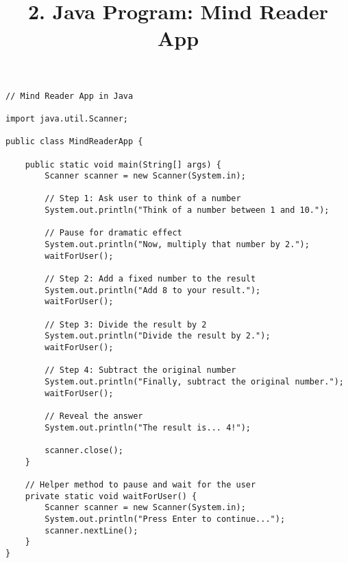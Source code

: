 \documentclass{article}
\begin{document}
\title{2. Java Program: Mind Reader App}
\author{}
\date{}
\maketitle

\begin{lstlisting}
// Mind Reader App in Java

import java.util.Scanner;

public class MindReaderApp {

    public static void main(String[] args) {
        Scanner scanner = new Scanner(System.in);
        
        // Step 1: Ask user to think of a number
        System.out.println("Think of a number between 1 and 10.");
        
        // Pause for dramatic effect
        System.out.println("Now, multiply that number by 2.");
        waitForUser();
        
        // Step 2: Add a fixed number to the result
        System.out.println("Add 8 to your result.");
        waitForUser();
        
        // Step 3: Divide the result by 2
        System.out.println("Divide the result by 2.");
        waitForUser();
        
        // Step 4: Subtract the original number
        System.out.println("Finally, subtract the original number.");
        waitForUser();
        
        // Reveal the answer
        System.out.println("The result is... 4!");
        
        scanner.close();
    }

    // Helper method to pause and wait for the user
    private static void waitForUser() {
        Scanner scanner = new Scanner(System.in);
        System.out.println("Press Enter to continue...");
        scanner.nextLine();
    }
}
\end{lstlisting}
\end{document}
